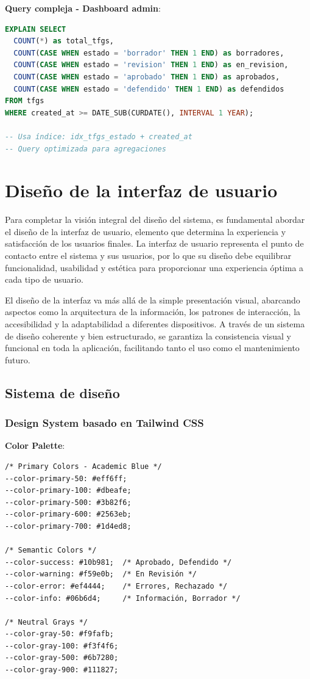 \documentclass[12pt,a4paper,oneside]{report}
\begin{document}
\textbf{Query compleja - Dashboard admin}:

\begin{lstlisting}[language=SQL]
EXPLAIN SELECT 
  COUNT(*) as total_tfgs,
  COUNT(CASE WHEN estado = 'borrador' THEN 1 END) as borradores,
  COUNT(CASE WHEN estado = 'revision' THEN 1 END) as en_revision,
  COUNT(CASE WHEN estado = 'aprobado' THEN 1 END) as aprobados,
  COUNT(CASE WHEN estado = 'defendido' THEN 1 END) as defendidos
FROM tfgs 
WHERE created_at >= DATE_SUB(CURDATE(), INTERVAL 1 YEAR);

-- Usa índice: idx_tfgs_estado + created_at
-- Query optimizada para agregaciones
\end{lstlisting}

\section{Diseño de la interfaz de
usuario}\label{diseuxf1o-de-la-interfaz-de-usuario}

Para completar la visión integral del diseño del sistema, es fundamental
abordar el diseño de la interfaz de usuario, elemento que determina la
experiencia y satisfacción de los usuarios finales. La interfaz de
usuario representa el punto de contacto entre el sistema y sus usuarios,
por lo que su diseño debe equilibrar funcionalidad, usabilidad y
estética para proporcionar una experiencia óptima a cada tipo de
usuario.

El diseño de la interfaz va más allá de la simple presentación visual,
abarcando aspectos como la arquitectura de la información, los patrones
de interacción, la accesibilidad y la adaptabilidad a diferentes
dispositivos. A través de un sistema de diseño coherente y bien
estructurado, se garantiza la consistencia visual y funcional en toda la
aplicación, facilitando tanto el uso como el mantenimiento futuro.

\subsection{Sistema de diseño}\label{sistema-de-diseuxf1o}

\subsubsection{Design System basado en Tailwind
CSS}\label{design-system-basado-en-tailwind-css}

\textbf{Color Palette}:

\begin{lstlisting}
/* Primary Colors - Academic Blue */
--color-primary-50: #eff6ff;
--color-primary-100: #dbeafe;
--color-primary-500: #3b82f6;
--color-primary-600: #2563eb;
--color-primary-700: #1d4ed8;

/* Semantic Colors */
--color-success: #10b981;  /* Aprobado, Defendido */
--color-warning: #f59e0b;  /* En Revisión */
--color-error: #ef4444;    /* Errores, Rechazado */
--color-info: #06b6d4;     /* Información, Borrador */

/* Neutral Grays */
--color-gray-50: #f9fafb;
--color-gray-100: #f3f4f6;
--color-gray-500: #6b7280;
--color-gray-900: #111827;
\end{lstlisting}
\end{document}
